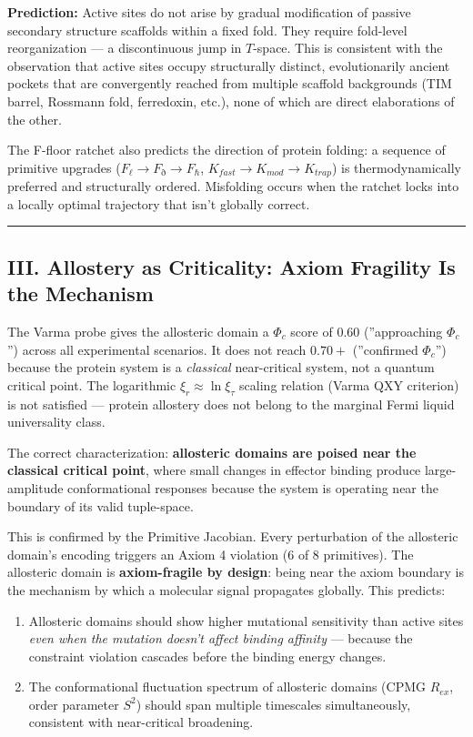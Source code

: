 \documentclass[10pt,a4paper]{article}
\begin{document}
\textbf{Prediction:} Active sites do not arise by gradual modification of passive secondary structure scaffolds within a fixed fold. They require fold-level reorganization --- a discontinuous jump in $T$-space. This is consistent with the observation that active sites occupy structurally distinct, evolutionarily ancient pockets that are convergently reached from multiple scaffold backgrounds (TIM barrel, Rossmann fold, ferredoxin, etc.), none of which are direct elaborations of the other.

The F-floor ratchet also predicts the direction of protein folding: a sequence of primitive upgrades ($F_\ell \to F_\eth \to F_\hbar$, $K_{fast} \to K_{mod} \to K_{trap}$) is thermodynamically preferred and structurally ordered. Misfolding occurs when the ratchet locks into a locally optimal trajectory that isn't globally correct.

\begin{center}
\rule{0.5\textwidth}{0.4pt}
\end{center}

\subsection{III. Allostery as Criticality: Axiom Fragility Is the Mechanism}

The Varma probe gives the allosteric domain a $\Phi_c$ score of $0.60$ (''approaching $\Phi_c$'') across all experimental scenarios. It does not reach $0.70+$ (''confirmed $\Phi_c$'') because the protein system is a \emph{classical} near-critical system, not a quantum critical point. The logarithmic $\xi_r \approx \ln \xi_\tau$ scaling relation (Varma QXY criterion) is not satisfied --- protein allostery does not belong to the marginal Fermi liquid universality class.

The correct characterization: \textbf{allosteric domains are poised near the classical critical point}, where small changes in effector binding produce large-amplitude conformational responses because the system is operating near the boundary of its valid tuple-space.

This is confirmed by the Primitive Jacobian. Every perturbation of the allosteric domain's encoding triggers an Axiom 4 violation (6 of 8 primitives). The allosteric domain is \textbf{axiom-fragile by design}: being near the axiom boundary is the mechanism by which a molecular signal propagates globally. This predicts:

\begin{enumerate}
    \item Allosteric domains should show higher mutational sensitivity than active sites \emph{even when the mutation doesn't affect binding affinity} --- because the constraint violation cascades before the binding energy changes.
    \item The conformational fluctuation spectrum of allosteric domains (CPMG $R_{ex}$, order parameter $S^2$) should span multiple timescales simultaneously, consistent with near-critical broadening.
\end{enumerate}
\end{document}
